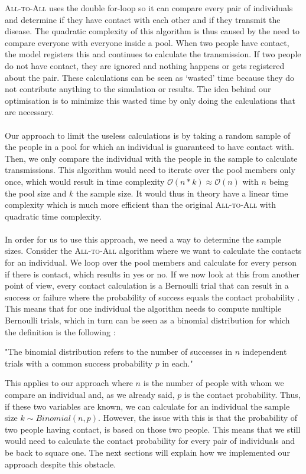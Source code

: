 \textsc{All-to-All} uses the double for-loop so it can compare every pair of individuals and determine if they have contact with each other and if they transmit the disease. The quadratic complexity of this algorithm is thus caused by the need to compare everyone with everyone inside a pool. When two people have contact, the model registers this and continues to calculate the transmission. If two people do not have contact, they are ignored and nothing happens or gets registered about the pair. These calculations can be seen as `wasted' time because they do not contribute anything to the simulation or results. The idea behind our optimisation is to minimize this wasted time by only doing the calculations that are necessary.
\\\\
Our approach to limit the useless calculations is by taking a random sample of the people in a pool for which an individual is guaranteed to have contact with. Then, we only compare the individual with the people in the sample to calculate transmissions. This algorithm would need to iterate over the pool members only once, which would result in time complexity $\mathcal{O}(n*k) \approx \mathcal{O}(n)$ with $n$ being the pool size and $k$ the sample size. It would thus in theory have a linear time complexity which is much more efficient than the original \textsc{All-to-All} with quadratic time complexity.
\\\\
In order for us to use this approach, we need a way to determine the sample sizes. Consider the \textsc{All-to-All} algorithm where we want to calculate the contacts for an individual. We loop over the pool members and calculate for every person if there is contact, which results in yes or no. If we now look at this from another point of view, every contact calculation is a Bernoulli trial that can result in a success or failure where the probability of success equals the contact probability \cite{bernoulli}. This means that for one individual the algorithm needs to compute multiple Bernoulli trials, which in turn can be seen as a binomial distribution for which the definition is the following \cite{binomial}:
\begin{quoting}
"The binomial distribution refers to the number of successes in $n$ independent trials with a common success probability $p$ in each."
\end{quoting}
\noindent This applies to our approach where $n$ is the number of people with whom we compare an individual and, as we already said, $p$ is the contact probability. Thus, if these two variables are known, we can calculate for an individual the sample size $k \sim Binomial(n, p)$. However, the issue with this is that the probability of two people having contact, is based on those two people. This means that we still would need to calculate the contact probability for every pair of individuals and be back to square one. The next sections will explain how we implemented our approach despite this obstacle.

